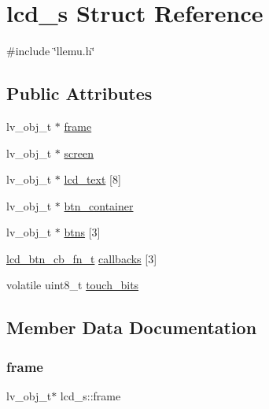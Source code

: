 \hypertarget{structlcd__s}{}\section{lcd\+\_\+s Struct Reference}
\label{structlcd__s}


{\ttfamily \#include \char`\"{}llemu.\+h\char`\"{}}

\subsection*{Public Attributes}
\begin{DoxyCompactItemize}
\item 
lv\+\_\+obj\+\_\+t $\ast$ \hyperlink{structlcd__s_a5067b029a06de4122b9629596a96ab2a}{frame}
\item 
lv\+\_\+obj\+\_\+t $\ast$ \hyperlink{structlcd__s_ae9982890a610a39d2a2c6986652d96fc}{screen}
\item 
lv\+\_\+obj\+\_\+t $\ast$ \hyperlink{structlcd__s_a79e5229a56be1854fa2f61cb6089f1c3}{lcd\+\_\+text} \mbox{[}8\mbox{]}
\item 
lv\+\_\+obj\+\_\+t $\ast$ \hyperlink{structlcd__s_a5b02408bab493ec0b9feca4042028fe1}{btn\+\_\+container}
\item 
lv\+\_\+obj\+\_\+t $\ast$ \hyperlink{structlcd__s_a66110a1c094e205651c998dfa28a57ff}{btns} \mbox{[}3\mbox{]}
\item 
\hyperlink{llemu_8h_a0f5bb2a3264a6ad95973f9c8e6b3198e}{lcd\+\_\+btn\+\_\+cb\+\_\+fn\+\_\+t} \hyperlink{structlcd__s_a94cf01cb0d74b92bdd798b95861ed2cd}{callbacks} \mbox{[}3\mbox{]}
\item 
volatile uint8\+\_\+t \hyperlink{structlcd__s_a6aaa4bc625cc13f48b47acd64bcfa757}{touch\+\_\+bits}
\end{DoxyCompactItemize}


\subsection{Member Data Documentation}
\mbox{\label{structlcd__s_a5067b029a06de4122b9629596a96ab2a}} 
\subsubsection{\texorpdfstring{frame}{frame}}
{\footnotesize\ttfamily lv\+\_\+obj\+\_\+t$\ast$ lcd\+\_\+s\+::frame}


